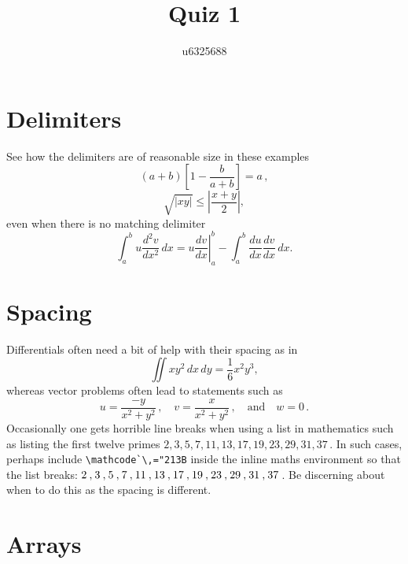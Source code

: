 \documentclass[20pt,a4paper]{extarticle}
\title{Quiz 1}
\author{u6325688}
\begin{document}
\maketitle


\section{Delimiters}

See how the delimiters are of reasonable size in these examples
\[
	\left(a+b\right)\left[1-\frac{b}{a+b}\right]=a\,,
\]
\[
	\sqrt{|xy|}\leq\left|\frac{x+y}{2}\right|,
\]
even when there is no matching delimiter
\[
	\int_a^bu\frac{d^2v}{dx^2}\,dx
	=\left.u\frac{dv}{dx}\right|_a^b
	-\int_a^b\frac{du}{dx}\frac{dv}{dx}\,dx.
\]






\section{Spacing}

Differentials often need a bit of help with their spacing as in
\[
	\iint xy^2\,dx\,dy 
	=\frac{1}{6}x^2y^3,
\]
whereas vector problems often lead to statements such as
\[
	u=\frac{-y}{x^2+y^2}\,,\quad
	v=\frac{x}{x^2+y^2}\,,\quad\text{and}\quad
	w=0\,.
\]
Occasionally one gets horrible line breaks when using a list in mathematics such as listing the first twelve primes  \(2,3,5,7,11,13,17,19,23,29,31,37\)\,.
In such cases, perhaps include \verb|\mathcode`\,="213B| inside the inline maths environment so that the list breaks: \(\mathcode`\,="213B 2,3,5,7,11,13,17,19,23,29,31,37\)\,.
Be discerning about when to do this as the spacing is different.






\section{Arrays}
\end{document}
